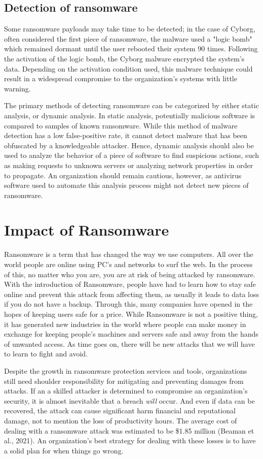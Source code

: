 \documentclass[11pt]{article}
\begin{document}
\subsection{Detection of ransomware}
\label{sec:org332918c}
Some ransomware payloads may take time to be detected; in the case of Cyborg, often considered the first piece of ransomware, the malware used a "logic bomb" which remained dormant until the user rebooted their system 90 times. Following the activation of the logic bomb, the Cyborg malware encrypted the system's data. Depending on the activation condition used, this malware technique could result in a widespread compromise to the organization's systems with little warning.

The primary methods of detecting ransomware can be categorized by either static analysis, or dynamic analysis. In static analysis, potentially malicious software is compared to samples of known ransomware. While this method of malware detection has a low false-positive rate, it cannot detect malware that has been obfuscated by a knowledgeable attacker. Hence, dynamic analysis should also be used to analyze the behavior of a piece of software to find suspicious actions, such as making requests to unknown servers or analyzing network properties in order to propagate. An organization should remain cautious, however, as antivirus software used to automate this analysis process might not detect new pieces of ransomware.

\section{Impact of Ransomware}
\label{sec:org4547d2c}
Ransomware is a term that has changed the way we use computers. All over the world people are online using PC’s and networks to surf the web. In the process of this, no matter who you are, you are at risk of being attacked by ransomware. With the introduction of Ransomware, people have had to learn how to stay safe online and prevent this attack from affecting them, as usually it leads to data loss if you do not have a backup. Through this, many companies have opened in the hopes of keeping users safe for a price. While Ransomware is not a positive thing, it has generated new industries in the world where people can make money in exchange for keeping people's machines and servers safe and away from the hands of unwanted access. As time goes on, there will be new attacks that we will have to learn to fight and avoid.

Despite the growth in ransomware protection services and tools, organizations still need shoulder responsibility for mitigating and preventing damages from attacks. If an a skilled attacker is determined to compromise an organization's security, it is almost inevitable that a breach \emph{will} occur. And even if data can be recovered, the attack can cause significant harm financial and reputational damage, not to mention the loss of productivity hours. The average cost of dealing with a ransomware attack was estimated to be \$1.85 million (Beaman et al., 2021). An organization's best strategy for dealing with these losses is to have a solid plan for when things go wrong.
\end{document}
